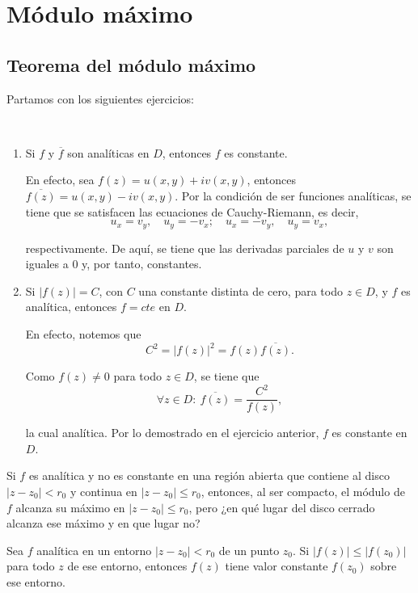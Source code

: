 \section{Módulo máximo}

\subsection{Teorema del módulo máximo}

Partamos con los siguientes ejercicios:

\begin{ejemplo} \label{EjemploTVM}
\ 

\begin{enumerate}
    \item Si $f$ y $\overline{f}$ son analíticas en $D$, entonces $f$ es constante. 
    
    En efecto, sea $f(z) = u(x,y) + iv(x,y)$, entonces $\overline{f(z)} = u(x,y) - iv(x,y)$. Por la condición de ser funciones analíticas, se tiene que se satisfacen las ecuaciones de Cauchy-Riemann, es decir, 
    $$u_x = v_y, \quad u_y = -v_x; \quad u_x = -v_y, \quad u_y = v_x,$$
    
    respectivamente. De aquí, se tiene que las derivadas parciales de $u$ y $v$ son iguales a 0 y, por tanto, constantes.
    
    \item Si $|f(z)| = C$, con $C$ una constante distinta de cero, para todo $z \in D$, y $f$ es analítica, entonces $f = cte$ en $D$.
    
    En efecto, notemos que 
    $$C^2 = |f(z)|^2 = f(z) \overline{f(z)}.$$
    
    Como $f(z) \neq 0$ para todo $z \in D$, se tiene que 
    $$\forall z\in D: ~ \overline{f(z)} = \frac{C^2}{f(z)},$$
    
    la cual analítica. Por lo demostrado en el ejercicio anterior, $f$ es constante en $D$.
\end{enumerate}
\end{ejemplo}

Si $f$ es analítica y no es constante en una región abierta que contiene al disco $|z-z_0| < r_0$ y continua en $|z-z_0| \leq r_0$, entonces, al ser compacto, el módulo de $f$ alcanza su máximo en $|z-z_0| \leq r_0$, pero ¿en qué lugar del disco cerrado alcanza ese máximo y en que lugar no?

\begin{lema} \label{LemaModuloMaximo}
Sea $f$ analítica en un entorno $|z-z_0| < r_0$ de un punto $z_0$. Si $|f(z)| \leq |f(z_0)|$ para todo $z$ de ese entorno, entonces $f(z)$ tiene valor constante $f(z_0)$ sobre ese entorno.
\end{lema}

